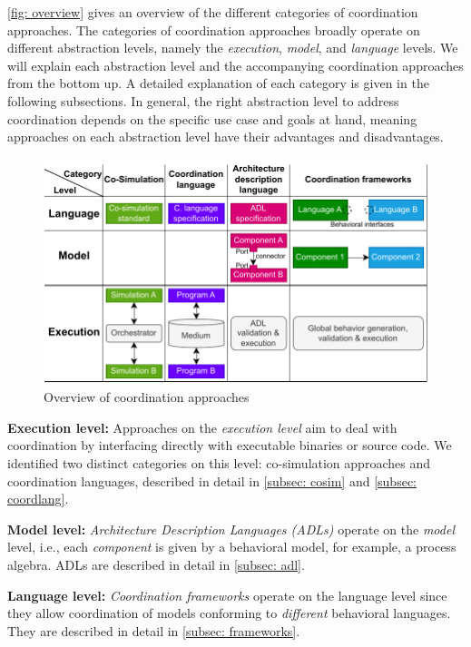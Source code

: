 \documentclass[runningheads]{llncs}
\begin{document}
\autoref{fig: overview} gives an overview of the different categories of coordination approaches.
The categories of coordination approaches broadly operate on different abstraction levels, namely the \textit{execution}, \textit{model}, and \textit{language} levels.
We will explain each abstraction level and the accompanying coordination approaches from the bottom up.
A detailed explanation of each category is given in the following subsections.
In general, the right abstraction level to address coordination depends on the specific use case and goals at hand, meaning approaches on each abstraction level have their advantages and disadvantages.

\begin{figure}[ht]
	\centering
	\includegraphics[width=1\textwidth]{images/overview}
	\caption{Overview of coordination approaches}
	\label{fig: overview}
\end{figure}

\textbf{Execution level:} Approaches on the \textit{execution level} aim to deal with coordination by interfacing directly with executable binaries or source code.
We identified two distinct categories on this level: co-simulation approaches and coordination languages, described in detail in \autoref{subsec: cosim} and \autoref{subsec: coordlang}.

\textbf{Model level:}
\textit{Architecture Description Languages (ADLs)} operate on the \textit{model} level, i.e., each \textit{component} is given by a behavioral model, for example, a process algebra.
ADLs are described in detail in \autoref{subsec: adl}.

\textbf{Language level:}
\textit{Coordination frameworks} operate on the language level since they allow coordination of models conforming to \textit{different} behavioral languages.
They are described in detail in \autoref{subsec: frameworks}.
\end{document}
